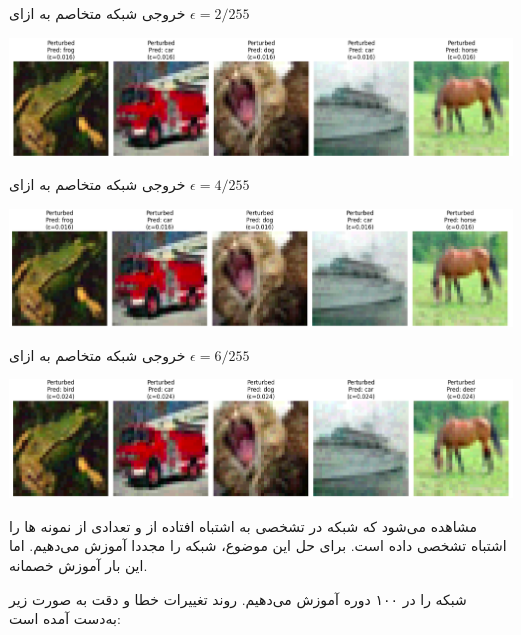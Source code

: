 \begin{qsolve}
	
	
	خروجی شبکه متخاصم به ازای $\epsilon=2/255$
	\begin{center}
		\includegraphics*[width=0.8\linewidth]{pics/img9.png}
		\label{خروجی شبکه متخاصم به ازای epsilon=2/255}
	\end{center}
	
	
	خروجی شبکه متخاصم به ازای $\epsilon=4/255$
	\begin{center}
		\includegraphics*[width=0.8\linewidth]{pics/img10.png}
		\label{خروجی شبکه متخاصم به ازای epsilon=4/255}
	\end{center}
	
	
	خروجی شبکه متخاصم به ازای $\epsilon=6/255$
	
	\begin{center}
		\includegraphics*[width=0.8\linewidth]{pics/img11.png}
		\label{خروجی شبکه متخاصم به ازای epsilon=6/255}
	\end{center}
	
	مشاهده می‌شود که شبکه در تشخصی به اشتباه افتاده از و تعدادی از نمونه ها را اشتباه تشخصی داده است. برای حل این موضوع، شبکه را مجددا آموزش می‌دهیم. اما این بار آموزش خصمانه.
	
	شبکه را در ۱۰۰ دوره آموزش می‌دهیم. روند تغییرات خطا و دقت به صورت زیر به‌دست آمده است:
\end{qsolve}



